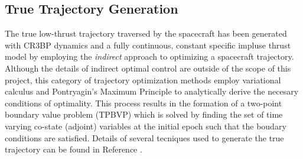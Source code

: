 \documentclass[letterpaper, submit]{AAS}			%
\begin{document}
\subsection{True Trajectory Generation}
The true low-thrust trajectory traversed by the spacecraft has been generated with CR3BP dynamics and a fully continuous, constant specific impluse thrust model by employing the \textit{indirect} approach to optimizing a spacecraft trajectory. Although the details of indirect optimal control are outside of the scope of this project, this category of trajectory optimization methods employ variational calculus and Pontryagin's Maximum Principle to analytically derive the necesary conditions of optimality. This process results in the formation of a two-point boundary value problem (TPBVP) which is solved by finding the set of time varying co-state (adjoint) variables at the initial epoch such that the boudary conditions are satisfied. Details of several tecniques used to generate the true trajectory can be found in Reference .
\end{document}
